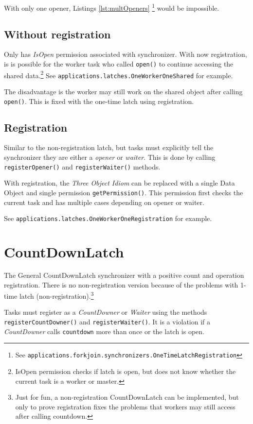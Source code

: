 \documentclass[9pt, twoside, a4paper]{article}
\begin{document}
    With only one opener, Listings \ref{lst:multOpeners}
    \footnote{See \lstinline{applications.forkjoin.synchronizers.OneTimeLatchRegistration}}
    would be impossible.

    \subsection{Without registration}
    Only has \textit{IsOpen} permission associated with synchronizer. With now registration, is is possible
    for the worker task who called \lstinline{open()} to continue accessing the shared data.\footnote{IsOpen
    permission checks if latch is open, but does not know whether the current task is a worker or master.}
    See \lstinline{applications.latches.OneWorkerOneShared} for example.

    The disadvantage is the worker may still work on the shared object after calling \lstinline{open()}. This is
    fixed with the one-time latch using registration.

    \subsection{Registration}
    Similar to the non-registration latch, but tasks must explicitly tell the synchronizer they are either a
    \textit{opener} or \textit{waiter}. This is done by calling \lstinline{registerOpener()} and
    \lstinline{registerWaiter()} methods.

    With registration, the \textit{Three Object Idiom} can be replaced with a single Data Object and single
    permission \lstinline{getPermission()}. This permission first checks the current task and has multiple
    cases depending on opener or waiter.

    See \lstinline{applications.latches.OneWorkerOneRegistration} for example.

    \section{CountDownLatch}
    The General CountDownLatch synchronizer with a positive count and operation registration. There is no
    non-registration version because of the problems with 1-time latch (non-registration).\footnote{
    Just for fun, a non-registration CountDownLatch can be implemented, but only to prove registration fixes
    the problems that workers may still access after calling countdown.
    }

    Tasks must register as a \textit{CountDowner} or \textit{Waiter} using the methods \lstinline{registerCountDowner()}
    and \lstinline{registerWaiter()}. It is a violation if a \textit{CountDowner} calls \lstinline{countdown} more than
    once or the latch is open.
\end{document}
